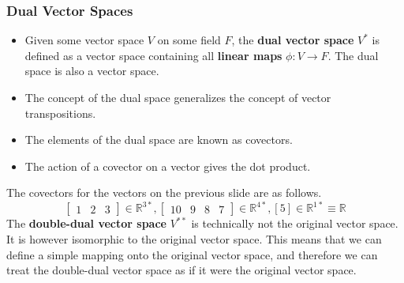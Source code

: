 \documentclass[10pt]{beamer}
\begin{document}
\begin{frame}
  \frametitle{Dual Vector Spaces}
  \begin{itemize}
  \item Given some vector space $V$ on some field $F$, the \textbf{dual vector space} $V^*$ is defined as a vector space containing all \textbf{linear maps} $\phi: V\rightarrow F$. The dual space is also a vector space.
  \item The concept of the dual space generalizes the concept of vector transpositions.
  \item The elements of the dual space are known as covectors.
  \item The action of a covector on a vector gives the dot product.
  \end{itemize}
  The covectors for the vectors on the previous slide are as follows.
  $$\left[\begin{matrix}
      1 & 2 & 3
    \end{matrix}\right] \in \mathbb{R}^{3*}, \left[\begin{matrix}
      10 & 9 & 8 & 7
    \end{matrix}\right] \in \mathbb{R}^{4*}, \left[5\right]\in \mathbb{R}^{1*} \equiv \mathbb{R}$$
  The \textbf{double-dual vector space} $V^{**}$ is technically not the original vector space. It is however isomorphic to the original vector space. This means that we can define a simple mapping onto the original vector space, and therefore we can treat the double-dual vector space as if it were the original vector space.
\end{frame}
\end{document}
